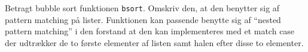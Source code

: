 Betragt bubble sort funktionen \texttt{bsort}.  Omskriv den, at den
benytter sig af pattern matching på lister. Funktionen kan passende
benytte sig af ``nested pattern matching'' i den forstand at den kan
implementeres med et match case der udtrækker de to første elementer
af listen samt halen efter disse to elementer.